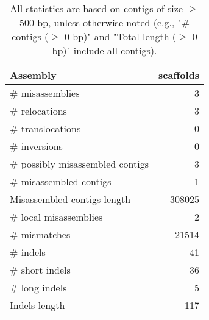 \documentclass[12pt,a4paper]{article}
\begin{document}
\begin{table}[ht]
\begin{center}
\caption{All statistics are based on contigs of size $\geq$ 500 bp, unless otherwise noted (e.g., "\# contigs ($\geq$ 0 bp)" and "Total length ($\geq$ 0 bp)" include all contigs).}
\begin{tabular}{|l*{1}{|r}|}
\hline
Assembly & scaffolds \\ \hline
\# misassemblies & 3 \\ \hline
\hspace{5mm}\# relocations & 3 \\ \hline
\hspace{5mm}\# translocations & 0 \\ \hline
\hspace{5mm}\# inversions & 0 \\ \hline
\# possibly misassembled contigs & 3 \\ \hline
\# misassembled contigs & 1 \\ \hline
Misassembled contigs length & 308025 \\ \hline
\# local misassemblies & 2 \\ \hline
\# mismatches & 21514 \\ \hline
\# indels & 41 \\ \hline
\hspace{5mm}\# short indels & 36 \\ \hline
\hspace{5mm}\# long indels & 5 \\ \hline
Indels length & 117 \\ \hline
\end{tabular}
\end{center}
\end{table}
\end{document}
